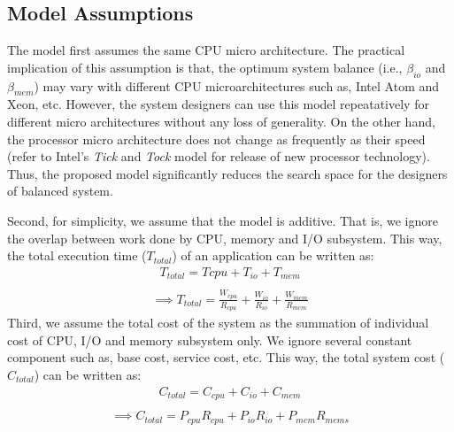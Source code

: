 \documentclass[journal]{IEEEtran}
\begin{document}

\subsection{Model Assumptions}
The model first assumes the same CPU micro architecture. The practical implication of this assumption is that, the optimum system balance (i.e., $\beta_{io}$ and $\beta_{mem}$) may vary with different CPU microarchitectures such as, Intel Atom and Xeon, etc. However, the system designers can use this model repeatatively for different micro architectures without any loss of generality. On the other hand, the processor micro architecture does not change as frequently as their speed (refer to Intel's \textit{Tick} and \textit{Tock} model for release of new processor technology). Thus, the proposed model significantly reduces the search space for the designers of balanced system.
  
Second, for simplicity, we assume that the model is additive. That is, we ignore the overlap between work done by CPU, memory and I/O subsystem. This way, the total execution time ($T_{total}$) of an application can be written as:
\begin{equation} %
\begin{split}
T_{total} = T{cpu} + T_{io} + T_{mem} \\
\end{split}
\end{equation}
\begin{equation} \label{eqn:TotalTime}
\begin{split}
\implies T_{total}  = \frac{W_{cpu}}{R_{cpu}} + \frac{W_{io}}{R_{io}} + \frac{W_{mem}}{R_{mem}}
\end{split}
\end{equation}
Third, we assume the total cost of the system as the summation of individual cost of CPU, I/O and memory subsystem only. We ignore several constant component such as, base cost, service cost, etc. This way, the total system cost ($C_{total}$) can be written as:
\begin{equation} %
\begin{split}
C_{total} = C_{cpu} + C_{io} + C_{mem} \\
\end{split}
\end{equation}
\begin{equation} \label{eqn:TotalCost}
\begin{split}
\implies C_{total} = P_{cpu}R_{cpu} + P_{io}R_{io} + P_{mem}R_{mems}
\end{split}
\end{equation}
\end{document}
